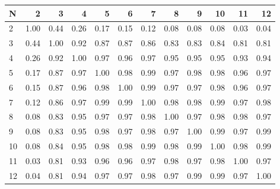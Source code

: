 \begin{tabular}{lrrrrrrrrrrr}
\toprule
N &    2  &    3  &    4  &    5  &    6  &    7  &    8  &    9  &    10 &    11 &    12 \\
\midrule
2  &  1.00 &  0.44 &  0.26 &  0.17 &  0.15 &  0.12 &  0.08 &  0.08 &  0.08 &  0.03 &  0.04 \\
3  &  0.44 &  1.00 &  0.92 &  0.87 &  0.87 &  0.86 &  0.83 &  0.83 &  0.84 &  0.81 &  0.81 \\
4  &  0.26 &  0.92 &  1.00 &  0.97 &  0.96 &  0.97 &  0.95 &  0.95 &  0.95 &  0.93 &  0.94 \\
5  &  0.17 &  0.87 &  0.97 &  1.00 &  0.98 &  0.99 &  0.97 &  0.98 &  0.98 &  0.96 &  0.97 \\
6  &  0.15 &  0.87 &  0.96 &  0.98 &  1.00 &  0.99 &  0.97 &  0.97 &  0.98 &  0.96 &  0.97 \\
7  &  0.12 &  0.86 &  0.97 &  0.99 &  0.99 &  1.00 &  0.98 &  0.98 &  0.99 &  0.97 &  0.98 \\
8  &  0.08 &  0.83 &  0.95 &  0.97 &  0.97 &  0.98 &  1.00 &  0.97 &  0.98 &  0.98 &  0.97 \\
9  &  0.08 &  0.83 &  0.95 &  0.98 &  0.97 &  0.98 &  0.97 &  1.00 &  0.99 &  0.97 &  0.99 \\
10 &  0.08 &  0.84 &  0.95 &  0.98 &  0.98 &  0.99 &  0.98 &  0.99 &  1.00 &  0.98 &  0.99 \\
11 &  0.03 &  0.81 &  0.93 &  0.96 &  0.96 &  0.97 &  0.98 &  0.97 &  0.98 &  1.00 &  0.97 \\
12 &  0.04 &  0.81 &  0.94 &  0.97 &  0.97 &  0.98 &  0.97 &  0.99 &  0.99 &  0.97 &  1.00 \\
\bottomrule
\end{tabular}
